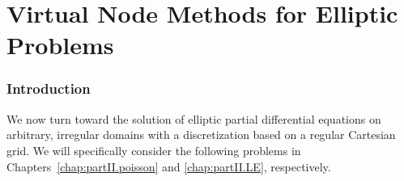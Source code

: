 %

\part{Virtual Node Methods for Elliptic Problems}

\renewcommand{\thechapter}{\thepart}

\section*{Introduction}

We now turn toward the solution of elliptic partial differential equations on arbitrary, irregular domains with a discretization based on a regular Cartesian grid. We will specifically consider the following problems in Chapters~\ref{chap:partII.poisson} and \ref{chap:partII.LE}, respectively.

